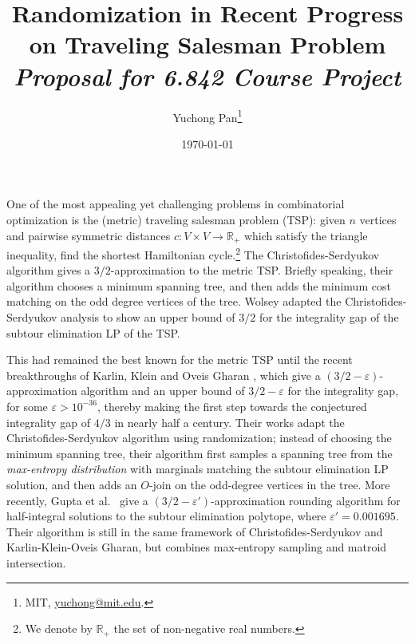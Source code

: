\documentclass[letterpaper, reqno,12pt]{article}
\newcommand{\RR}{\mathbb{R}}
\begin{document}
\title{\Large Randomization in Recent Progress on Traveling Salesman Problem \\ {\large \em Proposal for 6.842 Course Project}}
\author{Yuchong Pan\thanks{MIT, \href{mailto:yuchong@mit.edu}{yuchong@mit.edu}.}}
\date{\today}
\newtheorem{theorem}{Theorem}[section]
\newtheorem{lemma}[theorem]{Lemma}
\newtheorem{corollary}[theorem]{Corollary}
\theoremstyle{definition} \newtheorem{defn}{Definition}
\maketitle
%

One of the most appealing yet challenging problems in combinatorial optimization is the (metric) traveling salesman problem (TSP): given $n$ vertices and pairwise symmetric distances $c : V \times V \to \RR_+$ which satisfy the triangle inequality, find the shortest Hamiltonian cycle.\footnote{We denote by $\RR_+$ the set of non-negative real numbers.} The Christofides-Serdyukov algorithm \cite{christofides1976worst,serdyukov1978nekotorykh} gives a $3/2$-approximation to the metric TSP. Briefly speaking, their algorithm chooses a minimum spanning tree, and then adds the minimum cost matching on the odd degree vertices of the tree. Wolsey \cite{wolsey1980heuristic} adapted the Christofides-Serdyukov analysis to show an upper bound of $3/2$ for the integrality gap of the subtour elimination LP of the TSP.

This had remained the best known for the metric TSP until the recent breakthroughs of Karlin, Klein and Oveis Gharan \cite{karlin2021slightly,karlin2021slightlyig}, which give a $(3/2 - \varepsilon)$-approximation algorithm and an upper bound of $3/2 - \varepsilon$ for the integrality gap, for some $\varepsilon > 10^{-36}$, thereby making the first step towards the conjectured integrality gap of $4/3$ in nearly half a century. Their works adapt the Christofides-Serdyukov algorithm using randomization; instead of choosing the minimum spanning tree, their algorithm first samples a spanning tree from the \emph{max-entropy distribution} with marginals matching the subtour elimination LP solution, and then adds an $O$-join on the odd-degree vertices in the tree. More recently, Gupta et al.\ \cite{gupta2021matroid} give a $(3/2 - \varepsilon')$-approximation rounding algorithm for half-integral solutions to the subtour elimination polytope, where $\varepsilon' = 0.001695$. Their algorithm is still in the same framework of Christofides-Serdyukov and Karlin-Klein-Oveis Gharan, but combines max-entropy sampling and matroid intersection.
\end{document}
